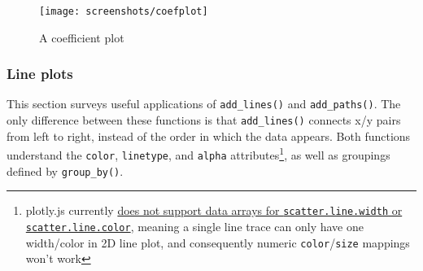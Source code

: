 \documentclass[12pt,]{isuthesis}
\newenvironment{Shaded}{\begin{snugshade}}{\end{snugshade}}
\newcommand{\KeywordTok}[1]{\textcolor[rgb]{0.13,0.29,0.53}{\textbf{{#1}}}}
\newcommand{\DataTypeTok}[1]{\textcolor[rgb]{0.13,0.29,0.53}{{#1}}}
\newcommand{\DecValTok}[1]{\textcolor[rgb]{0.00,0.00,0.81}{{#1}}}
\newcommand{\StringTok}[1]{\textcolor[rgb]{0.31,0.60,0.02}{{#1}}}
\newcommand{\CommentTok}[1]{\textcolor[rgb]{0.56,0.35,0.01}{\textit{{#1}}}}
\newcommand{\NormalTok}[1]{{#1}}
\let\rmarkdownfootnote\footnote%
\def\footnote{\protect\rmarkdownfootnote}
\begin{document}
\begin{Shaded}
\end{Shaded}

\begin{figure}
\centering
\texttt{[image: screenshots/coefplot]}
\caption{\label{fig:coefplot}A coefficient plot}
\end{figure}

\hypertarget{line-plots}{\subsubsection{Line plots}\label{line-plots}}

This section surveys useful applications of \texttt{add\_lines()} and
\texttt{add\_paths()}. The only difference between these functions is
that \texttt{add\_lines()} connects x/y pairs from left to right,
instead of the order in which the data appears. Both functions
understand the \texttt{color}, \texttt{linetype}, and \texttt{alpha}
attributes\footnote{plotly.js currently
  \href{https://github.com/plotly/plotly.js/issues/147}{does not support
  data arrays for \texttt{scatter.line.width} or
  \texttt{scatter.line.color}}, meaning a single line trace can only
  have one width/color in 2D line plot, and consequently numeric
  \texttt{color}/\texttt{size} mappings won't work}, as well as
groupings defined by \texttt{group\_by()}.
\end{document}
